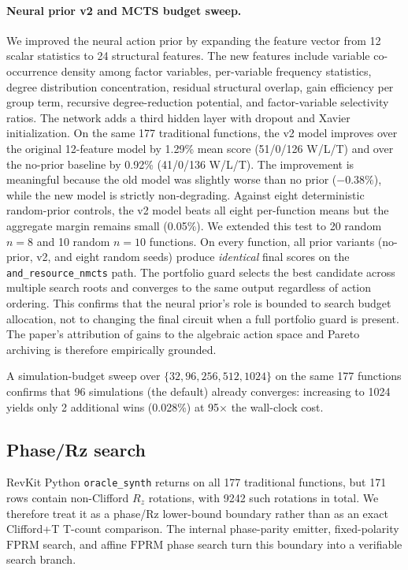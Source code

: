 \documentclass[11pt]{article}
\newcommand{\fprm}{\ensuremath{\mathrm{FPRM}}}
\newcommand{\rz}{\ensuremath{R_z}}
\begin{document}
\paragraph{Neural prior v2 and MCTS budget sweep.}
\label{sec:neural-v2-mcts-sweep}

We improved the neural action prior by expanding the feature vector from
12 scalar statistics to 24 structural features.  The new features include
variable co-occurrence density among factor variables, per-variable frequency
statistics, degree distribution concentration, residual structural overlap,
gain efficiency per group term, recursive degree-reduction potential, and
factor-variable selectivity ratios.  The network adds a third hidden layer
with dropout and Xavier initialization.  On the same 177 traditional functions,
the v2 model improves over the original 12-feature model by 1.29\% mean score
(51/0/126 W/L/T) and over the no-prior baseline by 0.92\% (41/0/136 W/L/T).
The improvement is meaningful because the old model was slightly worse than no
prior ($-0.38\%$), while the new model is strictly non-degrading.  Against
eight deterministic random-prior controls, the v2 model beats all eight
per-function means but the aggregate margin remains small (0.05\%).
We extended this test to 20 random $n{=}8$ and 10 random $n{=}10$ functions.
On every function, all prior variants (no-prior, v2, and eight random seeds)
produce \emph{identical} final scores on the \texttt{and\_resource\_nmcts}
path.  The portfolio guard selects the best candidate across multiple search
roots and converges to the same output regardless of action ordering.  This
confirms that the neural prior's role is bounded to search budget allocation,
not to changing the final circuit when a full portfolio guard is present.
The paper's attribution of gains to the algebraic action space and Pareto
archiving is therefore empirically grounded.


A simulation-budget sweep over $\{32, 96, 256, 512, 1024\}$ on the same 177
functions confirms that 96 simulations (the default) already converges:
increasing to 1024 yields only 2 additional wins (0.028\%) at 95$\times$ the
wall-clock cost.

\subsection{Phase/Rz search}

RevKit Python \texttt{oracle\_synth} returns on all 177 traditional functions,
but 171 rows contain non-Clifford \rz{} rotations, with 9242 such rotations in
total.  We therefore treat it as a phase/Rz lower-bound boundary rather than
as an exact Clifford+T T-count comparison.  The internal phase-parity emitter,
fixed-polarity \fprm{} search, and affine \fprm{} phase search turn this
boundary into a verifiable search branch.
\end{document}
